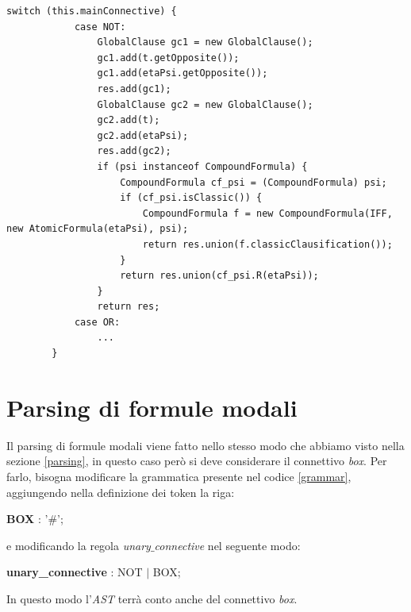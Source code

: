 \documentclass[a4paper,12pt]{report}
\begin{document}
\begin{minipage}{\linewidth}
    \small
    \begin{lstlisting}[caption={Parte del metodo \texttt{R} della classe \texttt{CompoundFormula}}, label={R}]
        switch (this.mainConnective) {
            case NOT:
                GlobalClause gc1 = new GlobalClause();
                gc1.add(t.getOpposite());
                gc1.add(etaPsi.getOpposite());
                res.add(gc1);
                GlobalClause gc2 = new GlobalClause();
                gc2.add(t);
                gc2.add(etaPsi);
                res.add(gc2);
                if (psi instanceof CompoundFormula) {
                    CompoundFormula cf_psi = (CompoundFormula) psi;
                    if (cf_psi.isClassic()) {
                        CompoundFormula f = new CompoundFormula(IFF, new AtomicFormula(etaPsi), psi);
                        return res.union(f.classicClausification());
                    }
                    return res.union(cf_psi.R(etaPsi));
                }
                return res;
            case OR:
                ...
        }
    \end{lstlisting}
\end{minipage}

\section*{Parsing di formule modali}
Il parsing di formule modali viene fatto nello stesso modo che abbiamo visto nella sezione \ref{parsing}, in questo caso però si deve considerare il connettivo \emph{box}. Per farlo, bisogna modificare la grammatica presente nel codice \ref{grammar}, aggiungendo nella definizione dei token la riga:
\begin{center}
    \textbf{BOX} : '$\#$';
\end{center}
e modificando la regola \emph{unary$\_$connective} nel seguente modo:
\begin{center}
    \textbf{unary\_connective} : NOT $|$  BOX;
\end{center}
In questo modo l'\emph{AST} terrà conto anche del connettivo \emph{box}.
\end{document}
